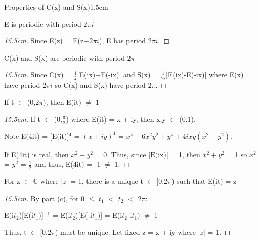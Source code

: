     \begin{ltheorem}{Properties of C(x) and S(x)}{1.5cm}
        \item E is periodic with period $2\pi i$
        
            \begin{proof}[15.5cm]
                Since E(z) = E(z+$2\pi i$), E has period $2\pi i$.
            \end{proof}
        
        \item C(x) and S(x) are periodic with period $2\pi$
        
            \begin{proof}[15.5cm]
                Since C(x) = $\frac{1}{2}$[E(ix)+E(-ix)] and
                S(x) = $\frac{1}{2i}$[E(ix)-E(-ix)] where E(x)
                have period $2\pi i$ so C(x) and S(x) have period $2\pi$.
            \end{proof}
        
        \item If t $\in$ (0,$2\pi$), then E(it) $\not =$ 1
        
            \begin{proof}[15.5cm]
                If t $\in$ (0,$\frac{\pi}{2}$) where E(it) = x + iy,
                then x,y $\in$ (0,1).

                Note E(4it) = [E(it)]$^4$ = $(x+iy)^4$
                = $x^4 - 6x^2y^2 + y^4 + 4ixy(x^2 - y^2)$.

                If E(4it) is real, then $x^2 - y^2$ = 0.
                Thus, since $|\text{E(ix)}|$ = 1, then $x^2 + y^2$ = 1
                so $x^2$ = $y^2$ = $\frac{1}{2}$ and thus,
                E(4it) = -1 $\not =$ 1.
            \end{proof}

            \newpage
        
        \item For z $\in$ $\mathbb{C}$ where $|z|$ = 1,
            there is a unique t $\in$ [0,$2\pi$) such that E(it) = z

            \begin{proof}[15.5cm]
                By part (c), for 0 $\leq$ $t_1$ $<$ $t_2$ $<$ $2\pi$:
                
                \hspace{0.5cm}
                E(i$t_2$)[E(i$t_1$)]$^{-1}$
                = E(i$t_2$)[E(-i$t_1$)] = E(i$t_2$-i$t_1$) $\not =$ 1

                Thus, t $\in$ [0,$2\pi$) must be unique.
                Let fixed z = x + iy where $|z|$ = 1.


\end{proof}
\end{ltheorem}
